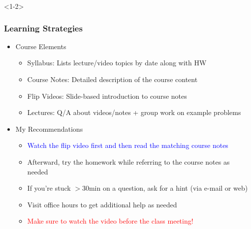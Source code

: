 \documentclass[10pt,english,aspectratio=169]{beamer}
\begin{document}
\begin{frame}
\begin{itemize}
\begin{itemize}
\end{itemize}
\end{itemize}


\end{frame}


\begin{frame}<1-2> \frametitle{Learning Strategies}

\begin{itemize}
\item<1-> Course Elements \vspace{1mm}

\begin{itemize}
  \setlength\itemsep{2mm}
  \item Syllabus: Lists lecture/video topics by date along with HW
  \item Course Notes: Detailed description of the course content
  \item Flip Videos: Slide-based introduction to course notes \smash{\Smiley[1.4][yellow]}
  \item Lectures: Q/A about videos/notes + group work on example problems \vspace{4mm}
\end{itemize}

\item<2-> My Recommendations \vspace{1mm}

\begin{itemize}
  \setlength\itemsep{2mm}
  \item \textcolor{blue}{Watch the flip video first and then read the matching course notes}
  \item Afterward, try the homework while referring to the course notes as needed
  \item If you're stuck $>\!30$min on a question, ask for a hint (via e-mail or web)
  \item Visit office hours to get additional help as needed
  \item \textcolor{red}{Make sure to watch the video before the class meeting!}
\end{itemize}


\end{itemize}
\end{frame}
\end{document}
